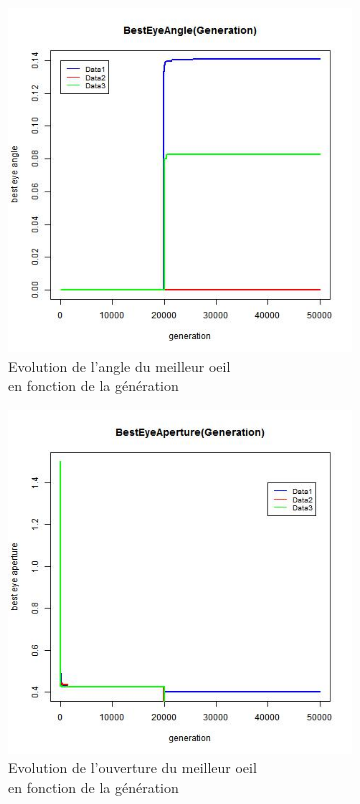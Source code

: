 \documentclass[a4paper,11pt]{article}
\begin{document}
\begin{figure}
\centering
\begin{subfigure}{.5\textwidth}
  \centering
\includegraphics[width=1\linewidth]{best_eye_angle.jpeg}
\caption{Evolution de l'angle du meilleur oeil \\en fonction de la génération}
\label{fig:modelisation}
\end{subfigure}%
\begin{subfigure}{.5\textwidth}
  \centering
\includegraphics[width=1\linewidth]{best_eye_aperture.jpeg}
\caption{Evolution de l'ouverture du meilleur oeil \\en fonction de la génération}
\label{fig:modelisation}
\end{subfigure}
\caption{}
\label{fig:test}
\end{figure}
\end{document}
